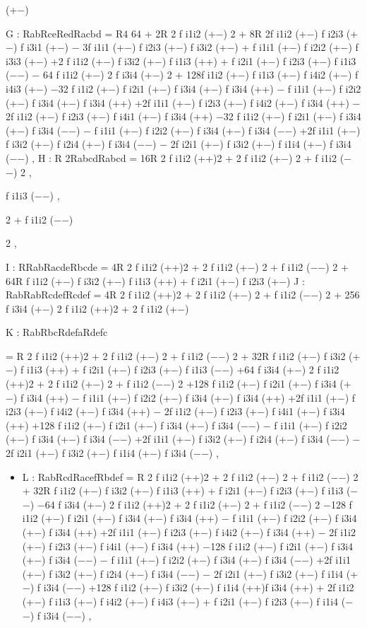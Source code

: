 \documentclass{article}
\begin{document}
(+−)

G : RabRceRedRacbd = R4 64 + 2R 2 f i1i2 (+−) 2 + 8R 2f i1i2 (+−) f i2i3 (+−) f i3i1 (+−) − 3f i1i1 (+−) f i2i3 (+−) f i3i2 (+−) + f i1i1 (+−) f i2i2 (+−) f i3i3 (+−) +2 f i1i2 (+−) f i3i2 (+−) f i1i3 (++) + f i2i1 (+−) f i2i3 (+−) f i1i3 (−−) − 64 f i1i2 (+−) 2 f i3i4 (+−) 2 + 128f i1i2 (+−) f i1i3 (+−) f i4i2 (+−) f i4i3 (+−) −32 f i1i2 (+−) f i2i1 (+−) f i3i4 (+−) f i3i4 (++) − f i1i1 (+−) f i2i2 (+−) f i3i4 (+−) f i3i4 (++) +2f i1i1 (+−) f i2i3 (+−) f i4i2 (+−) f i3i4 (++) − 2f i1i2 (+−) f i2i3 (+−) f i4i1 (+−) f i3i4 (++) −32 f i1i2 (+−) f i2i1 (+−) f i3i4 (+−) f i3i4 (−−) − f i1i1 (+−) f i2i2 (+−) f i3i4 (+−) f i3i4 (−−) +2f i1i1 (+−) f i3i2 (+−) f i2i4 (+−) f i3i4 (−−) − 2f i2i1 (+−) f i3i2 (+−) f i1i4 (+−) f i3i4 (−−) , H : R 2RabcdRabcd = 16R 2 f i1i2 (++)2 + 2 f i1i2 (+−) 2 + f i1i2 (−−) 2 ,

f i1i3 (−−) ,

2 + f i1i2 (−−)

2 ,

I : RRabRacdeRbcde = 4R 2 f i1i2 (++)2 + 2 f i1i2 (+−) 2 + f i1i2 (−−) 2 + 64R f i1i2 (+−) f i3i2 (+−) f i1i3 (++) + f i2i1 (+−) f i2i3 (+−) J : RabRabRcdefRcdef = 4R 2 f i1i2 (++)2 + 2 f i1i2 (+−) 2 + f i1i2 (−−) 2 + 256 f i3i4 (+−) 2 f i1i2 (++)2 + 2 f i1i2 (+−)

K : RabRbcRdefaRdefc

= R 2 f i1i2 (++)2 + 2 f i1i2 (+−) 2 + f i1i2 (−−) 2 + 32R f i1i2 (+−) f i3i2 (+−) f i1i3 (++) + f i2i1 (+−) f i2i3 (+−) f i1i3 (−−) +64 f i3i4 (+−) 2 f i1i2 (++)2 + 2 f i1i2 (+−) 2 + f i1i2 (−−) 2 +128 f i1i2 (+−) f i2i1 (+−) f i3i4 (+−) f i3i4 (++) − f i1i1 (+−) f i2i2 (+−) f i3i4 (+−) f i3i4 (++) +2f i1i1 (+−) f i2i3 (+−) f i4i2 (+−) f i3i4 (++) − 2f i1i2 (+−) f i2i3 (+−) f i4i1 (+−) f i3i4 (++) +128 f i1i2 (+−) f i2i1 (+−) f i3i4 (+−) f i3i4 (−−) − f i1i1 (+−) f i2i2 (+−) f i3i4 (+−) f i3i4 (−−) +2f i1i1 (+−) f i3i2 (+−) f i2i4 (+−) f i3i4 (−−) − 2f i2i1 (+−) f i3i2 (+−) f i1i4 (+−) f i3i4 (−−) ,
\begin{itemize}
\item 
L : RabRcdRacefRbdef
= R 2 f i1i2 (++)2 + 2 f i1i2 (+−) 2 + f i1i2 (−−) 2 + 32R f i1i2 (+−) f i3i2 (+−) f i1i3 (++) + f i2i1 (+−) f i2i3 (+−) f i1i3 (−−) −64 f i3i4 (+−) 2 f i1i2 (++)2 + 2 f i1i2 (+−) 2 + f i1i2 (−−) 2 −128 f i1i2 (+−) f i2i1 (+−) f i3i4 (+−) f i3i4 (++) − f i1i1 (+−) f i2i2 (+−) f i3i4 (+−) f i3i4 (++) +2f i1i1 (+−) f i2i3 (+−) f i4i2 (+−) f i3i4 (++) − 2f i1i2 (+−) f i2i3 (+−) f i4i1 (+−) f i3i4 (++) −128 f i1i2 (+−) f i2i1 (+−) f i3i4 (+−) f i3i4 (−−) − f i1i1 (+−) f i2i2 (+−) f i3i4 (+−) f i3i4 (−−) +2f i1i1 (+−) f i3i2 (+−) f i2i4 (+−) f i3i4 (−−) − 2f i2i1 (+−) f i3i2 (+−) f i1i4 (+−) f i3i4 (−−) +128 f i1i2 (+−) f i3i2 (+−) f i1i4 (++)f i3i4 (++) + 2f i1i2 (+−) f i1i3 (+−) f i4i2 (+−) f i4i3 (+−) + f i2i1 (+−) f i2i3 (+−) f i1i4 (−−) f i3i4 (−−) ,

\end{itemize}
\end{document}
